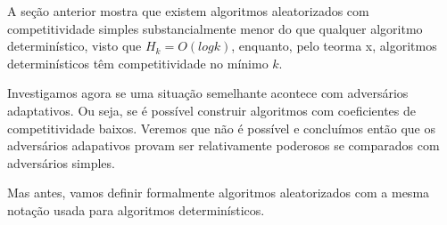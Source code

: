 A seção anterior mostra que existem algoritmos aleatorizados com competitividade simples substancialmente menor do que qualquer algoritmo determinístico, visto que \(H_k = O(log k)\), enquanto, pelo teorma x, algoritmos determinísticos têm competitividade no mínimo \(k\).

Investigamos agora se uma situação semelhante acontece com adversários adaptativos. Ou seja, se é possível construir algoritmos com coeficientes de competitividade baixos. Veremos que não é possível e concluímos então que os adversários adapativos provam ser relativamente poderosos se comparados com adversários simples.

Mas antes, vamos definir formalmente algoritmos aleatorizados com a mesma notação usada para algoritmos determinísticos.
